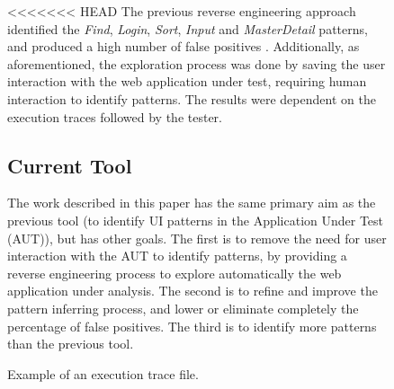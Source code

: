 \documentclass[conference]{IEEEtran}
\begin{document}
\begin{enumerate}
\begin{figure}[!htb]
\begin{itemize}
\begin{table}[!htb]
\caption{Example of an execution trace file.}
\label{tab:exec}
\end{table}

<<<<<<< HEAD
The previous reverse engineering approach identified the \textit{Find}, \textit{Login}, \textit{Sort}, \textit{Input} and \textit{MasterDetail} patterns, and produced a high number of false positives \cite{nabuco2013inferring}. Additionally, as aforementioned, the exploration process was done by saving the user interaction with the web application under test, requiring human interaction to identify patterns. The results were dependent on the execution traces followed by the tester. 

\subsection{Current Tool}

The work described in this paper has the same primary aim as the previous tool (to identify UI patterns in the Application Under Test (AUT)), but has other goals. The first is to remove the need for user interaction with the AUT to identify patterns, by providing a reverse engineering process to explore automatically the web application under analysis. The second is to refine and improve the pattern inferring process, and lower or eliminate completely the percentage of false positives. The third is to identify more patterns than the previous tool.


\end{itemize}
\end{figure}
\end{enumerate}
\end{document}
